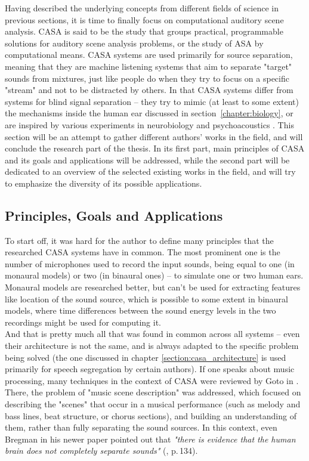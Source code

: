Having described the underlying concepts from different fields of science in previous sections, it is time to finally focus on computational auditory scene analysis. CASA is said to be the study that groups practical, programmable solutions for auditory scene analysis problems, or the study of ASA by computational means. CASA systems are used primarily for source se\-pa\-ra\-tion, meaning that they are machine listening systems that aim to separate "target" sounds from mixtures, just like people do when they try to focus on a specific "stream" and not to be distracted by others. In that CASA systems differ from systems for blind signal separation – they try to mimic (at least to some extent) the mechanisms inside the human ear discussed in section~\ref{chapter:biology}, or are inspired by various experiments in neurobiology and psychoacoustics \cite{VanDerKouwe2001}. This section will be an attempt to gather different authors' works in the field, and will conclude the research part of the thesis. In its first part, main principles of CASA and its goals and applications will be addressed, while the second part will be dedicated to an overview of the selected existing works in the field, and will try to emphasize the diversity of its possible applications.

\subsection{Principles, Goals and Applications}

To start off, it was hard for the author to define many principles that the researched CASA systems have in common. The most prominent one is the number of microphones used to record the input sounds, being equal to one (in monaural models) or two (in binaural ones) -- to simulate one or two human ears. Monaural models are researched better, but can't be used for extracting features like location of the sound source, which is possible to some extent in binaural models, where time differences between the sound energy levels in the two recordings might be used for computing it.\\

And that is pretty much all that was found in common across all systems -- even their architecture is not the same, and is always adapted to the specific problem being solved (the one discussed in chapter \ref{section:casa_architecture} is used primarily for speech segregation by certain authors). If one speaks about music processing, many techniques in the context of CASA were reviewed by Goto in \cite{Wang2006}. There, the problem of "music scene description" was addressed, which focused on describing the "scenes" that occur in a musical performance (such as melody and bass lines, beat structure, or chorus sections), and building an understanding of them, rather than fully separating the sound sources. In this context, even Bregman in his newer paper pointed out that \textit{"there is evidence that the human brain does not completely separate sounds"} (\cite{Bregman1995}, p.\,134).\\

